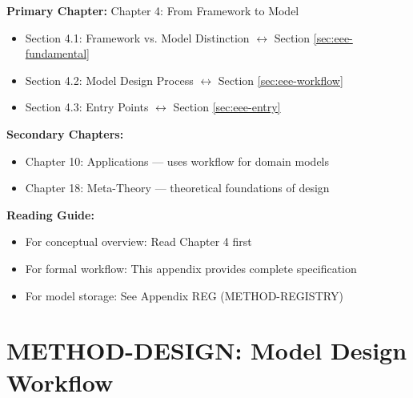 \begin{tcolorbox}[colback=purple!5!white, colframe=purple!75!black,
    title=Chapter Linkage]

\textbf{Primary Chapter:} Chapter 4: From Framework to Model
\begin{itemize}[nosep]
\item Section 4.1: Framework vs. Model Distinction $\leftrightarrow$ Section \ref{sec:eee-fundamental}
\item Section 4.2: Model Design Process $\leftrightarrow$ Section \ref{sec:eee-workflow}
\item Section 4.3: Entry Points $\leftrightarrow$ Section \ref{sec:eee-entry}
\end{itemize}

\textbf{Secondary Chapters:}
\begin{itemize}[nosep]
\item Chapter 10: Applications --- uses workflow for domain models
\item Chapter 18: Meta-Theory --- theoretical foundations of design
\end{itemize}

\textbf{Reading Guide:}
\begin{itemize}[nosep]
\item For conceptual overview: Read Chapter 4 first
\item For formal workflow: This appendix provides complete specification
\item For model storage: See Appendix REG (METHOD-REGISTRY)
\end{itemize}

\end{tcolorbox}

\chapter{METHOD-DESIGN: Model Design Workflow}
\label{app:method-design}

\begin{abstract}
This appendix defines the systematic workflow for designing testable behavioral
models from the Evidence-Based Framework (EBF). The workflow supports two entry
points---theory-driven and practice-driven (Gestaltungsanlass)---which converge
through iterative Scope-Context specification. Central to the workflow is the
3+1 Choice Architecture (Axiom MD-1), which provides three curated options plus
one self-defined option at each decision point. Options are drawn from the Model
Registry (Appendix REG) via similarity search (Axiom MD-2).
\end{abstract}

